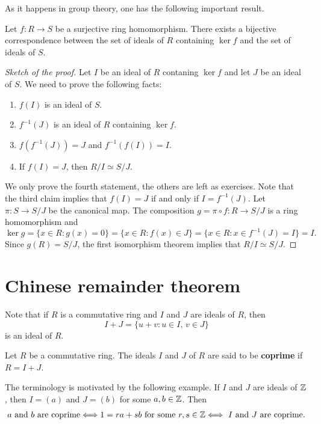As it happens in group theory, one has the following important result. 

\begin{theorem}
	Let $f\colon R\to S$ be a surjective ring homomorphism. There exists a
	bijective correspondence between 
	the set of ideals of $R$ containing $\ker f$ and
	the set of ideals of $S$.  
\end{theorem}

\begin{proof}[Sketch of the proof]
Let $I$ be an ideal of $R$ contaning $\ker f$ and
let $J$ be an ideal of $S$. 
We need to prove the following facts:
\begin{enumerate}
\item $f(I)$ is an ideal of $S$.
\item $f^{-1}(J)$ is an ideal of $R$ containing $\ker f$. 
\item $f(f^{-1}(J))=J$ and $f^{-1}(f(I))=I$. 
\item If $f(I)=J$, then $R/I\simeq S/J$. 
\end{enumerate}
We only prove the fourth statement, the others are left as exercises. Note that
the third claim implies that $f(I)=J$ if and only if $I=f^{-1}(J)$. 
Let 
$\pi\colon S\to S/J$ be the canonical map. The composition
$g=\pi\circ f\colon R\to S/J$ is a ring homomorphism and
\[
\ker g=\{x\in R:g(x)=0\}=\{x\in R:f(x)\in J\}=\{x\in R:x\in f^{-1}(J)=I\}=I.
\]
Since $g(R)=S/J$, the first isomorphism theorem implies that $R/I\simeq S/J$.
\end{proof}

\section*{Chinese remainder theorem}

Note that if $R$ is a commutative ring and $I$ and $J$ are ideals of $R$, then
\[
I+J=\{u+v:u\in I,\,v\in J\}
\]
is an ideal of $R$. 

\begin{definition}
	Let $R$ be a commutative ring. The ideals $I$ and $J$ of $R$ are said to be
	\textbf{coprime} if $R=I+J$.  
\end{definition}

The terminology is motivated by the following example. If $I$ and $J$ are
ideals of $\mathbb{Z}$, then $I=(a)$ and $J=(b)$ for some $a,b\in\mathbb{Z}$. Then
\begin{align*}
\text{$a$ and $b$ are coprime}
\Longleftrightarrow 1=ra+sb\text{ for some $r,s\in\mathbb{Z}$}
\Longleftrightarrow\text{ $I$ and $J$ are coprime.}
\end{align*}

